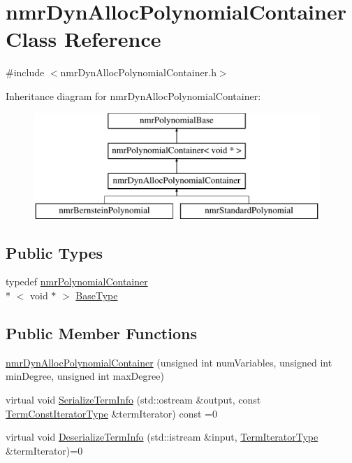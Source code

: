 \hypertarget{classnmr_dyn_alloc_polynomial_container}{\section{nmr\-Dyn\-Alloc\-Polynomial\-Container Class Reference}
\label{classnmr_dyn_alloc_polynomial_container}
}


{\ttfamily \#include $<$nmr\-Dyn\-Alloc\-Polynomial\-Container.\-h$>$}

Inheritance diagram for nmr\-Dyn\-Alloc\-Polynomial\-Container\-:\begin{figure}[H]
\begin{center}
\leavevmode
\includegraphics[height=4.000000cm]{dc/d85/classnmr_dyn_alloc_polynomial_container}
\end{center}
\end{figure}
\subsection*{Public Types}
\begin{DoxyCompactItemize}
\item 
typedef \hyperlink{classnmr_polynomial_container}{nmr\-Polynomial\-Container}\\*
$<$ void $\ast$ $>$ \hyperlink{classnmr_dyn_alloc_polynomial_container_a237c3e90961020b060ad1118206f4079}{Base\-Type}
\end{DoxyCompactItemize}
\subsection*{Public Member Functions}
\begin{DoxyCompactItemize}
\item 
\hyperlink{classnmr_dyn_alloc_polynomial_container_a31ea4b22ad8d90980ec372d8ba666b41}{nmr\-Dyn\-Alloc\-Polynomial\-Container} (unsigned int num\-Variables, unsigned int min\-Degree, unsigned int max\-Degree)
\item 
virtual void \hyperlink{classnmr_dyn_alloc_polynomial_container_a523aa33f3b5729a4cd9500fa278e56c6}{Serialize\-Term\-Info} (std\-::ostream \&output, const \hyperlink{classnmr_polynomial_container_aba8d31506ab6a487fdc4fe2815469442}{Term\-Const\-Iterator\-Type} \&term\-Iterator) const =0
\item 
virtual void \hyperlink{classnmr_dyn_alloc_polynomial_container_a166383324b0c1392e5faf798d7c5a622}{Deserialize\-Term\-Info} (std\-::istream \&input, \hyperlink{classnmr_polynomial_container_a276e57445d038e8a16462f47b85719a3}{Term\-Iterator\-Type} \&term\-Iterator)=0
\end{DoxyCompactItemize}
